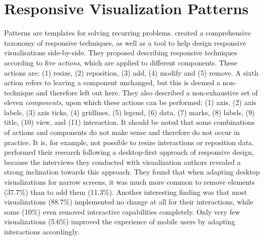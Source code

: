 \section{Responsive Visualization Patterns}

Patterns are templates for solving recurring problems.
\textcite{TechniquesForFlexibleRespVisDesign} created a comprehensive
taxonomy of responsive techniques, as well as a tool to help design
responsive visualisations side-by-side. They proposed describing
responsive techniques according to five \emph{actions}, which are
applied to different components. These actions are: (1) resize, (2)
reposition, (3) add, (4) modify and (5) remove. A sixth action refers
to leaving a component unchanged, but this is deemed a non-technique
and therefore left out here. They also described a non-exhaustive set
of eleven \emph{components}, upon which these actions can be
performed: (1) axis, (2) axis labels, (3) axis ticks, (4) gridlines,
(5) legend, (6) data, (7) marks, (8) labels, (9) title, (10) view, and
(11) interaction. It should be noted that some combinations of actions
and components do not make sense and therefore do not occur in
practice. It is, for example, not possible to resize interactions or
reposition data.  \textcite{TechniquesForFlexibleRespVisDesign}
performed their research following a desktop-first approach of
responsive design, because the interviews they conducted with
visualization authors revealed a strong inclination towards this
approach. They found that when adapting desktop visualizations for
narrow screens, it was much more common to remove elements (37.7\%)
than to add them (11.3\%). Another interesting finding was that most
visualizations (88.7\%) implemented no change at all for their
interactions, while some (10\%) even removed interactive capabilities
completely. Only very few visualizations (5.6\%) improved the
experience of mobile users by adapting interactions accordingly.



